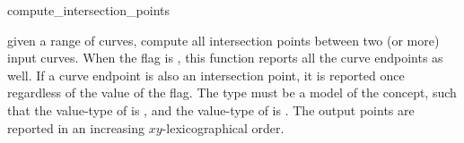 \ccRefPageBegin

\begin{ccRefFunction}{compute_intersection_points}


{given a range of curves, compute all intersection points between two (or more)
 input curves. When the flag  is , 
  this function reports all the curve endpoints as well. If a curve
  endpoint is also an intersection point, it is reported once regardless
  of the value of the  flag. The  type
  must be a model of the  concept, such that the
  value-type of  is , and the
  value-type of  is .
 The output points are reported in an increasing $xy$-lexicographical order.}

\end{ccRefFunction}

\ccRefPageEnd

